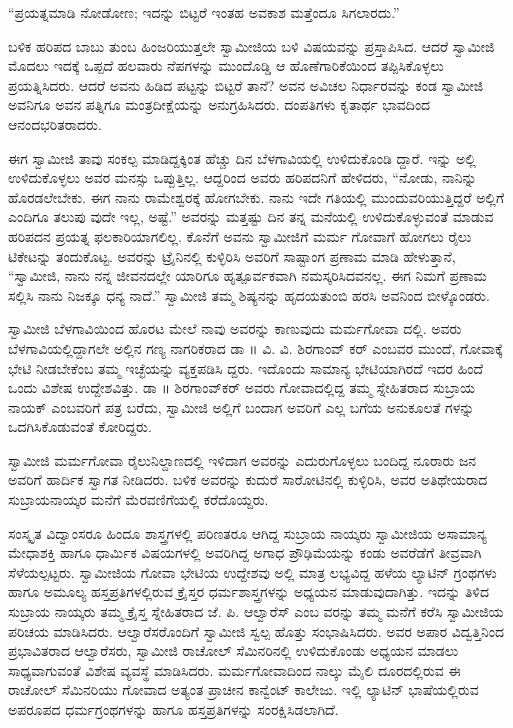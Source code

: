 “ಪ್ರಯತ್ನಮಾಡಿ ನೋಡೋಣ; ಇದನ್ನು ಬಿಟ್ಟರೆ ಇಂತಹ ಅವಕಾಶ ಮತ್ತೆಂದೂ ಸಿಗಲಾರದು.”

ಬಳಿಕ ಹರಿಪದ ಬಾಬು ತುಂಬ ಹಿಂಜರಿಯುತ್ತಲೇ ಸ್ವಾಮೀಜಿಯ ಬಳಿ ವಿಷಯವನ್ನು ಪ್ರಸ್ತಾಪಿಸಿದ. ಆದರೆ ಸ್ವಾಮೀಜಿ ಮೊದಲು ಇದಕ್ಕೆ ಒಪ್ಪದೆ ಹಲವಾರು ನೆಪಗಳನ್ನು ಮುಂದೊಡ್ಡಿ ಆ ಹೊಣೆಗಾರಿಕೆಯಿಂದ ತಪ್ಪಿಸಿಕೊಳ್ಳಲು ಪ್ರಯತ್ನಿಸಿದರು. ಆದರೆ ಅವನು ಹಿಡಿದ ಪಟ್ಟನ್ನು ಬಿಟ್ಟರೆ ತಾನೆ? ಅವನ ಅವಿಚಲ ನಿರ್ಧಾರವನ್ನು ಕಂಡ ಸ್ವಾಮೀಜಿ ಅವನಿಗೂ ಅವನ ಪತ್ನಿಗೂ ಮಂತ್ರದೀಕ್ಷೆಯನ್ನು ಅನುಗ್ರಹಿಸಿದರು. ದಂಪತಿಗಳು ಕೃತಾರ್ಥ ಭಾವದಿಂದ ಆನಂದಭರಿತರಾದರು.

ಈಗ ಸ್ವಾಮೀಜಿ ತಾವು ಸಂಕಲ್ಪ ಮಾಡಿದ್ದಕ್ಕಿಂತ ಹೆಚ್ಚು ದಿನ ಬೆಳಗಾವಿಯಲ್ಲಿ ಉಳಿದುಕೊಂಡಿ ದ್ದಾರೆ. ಇನ್ನು ಅಲ್ಲಿ ಉಳಿದುಕೊಳ್ಳಲು ಅವರ ಮನಸ್ಸು ಒಪ್ಪುತ್ತಿಲ್ಲ. ಆದ್ದರಿಂದ ಅವರು ಹರಿಪದನಿಗೆ ಹೇಳಿದರು, “ನೋಡು, ನಾನಿನ್ನು ಹೊರಡಲೇಬೇಕು. ಈಗ ನಾನು ರಾಮೇಶ್ವರಕ್ಕೆ ಹೋಗಬೇಕು. ನಾನು ಇದೇ ಗತಿಯಲ್ಲಿ ಮುಂದುವರಿಯುತ್ತಿದ್ದರೆ ಅಲ್ಲಿಗೆ ಎಂದಿಗೂ ತಲುಪು ವುದೇ ಇಲ್ಲ, ಅಷ್ಟೆ.” ಅವರನ್ನು ಮತ್ತಷ್ಟು ದಿನ ತನ್ನ ಮನೆಯಲ್ಲಿ ಉಳಿದುಕೊಳ್ಳುವಂತೆ ಮಾಡುವ ಹರಿಪದನ ಪ್ರಯತ್ನ ಫಲಕಾರಿಯಾಗಲಿಲ್ಲ. ಕೊನೆಗೆ ಅವನು ಸ್ವಾಮೀಜಿಗೆ ಮರ್ಮ ಗೋವಾಗೆ ಹೋಗಲು ರೈಲು ಟಿಕೇಟನ್ನು ತಂದುಕೊಟ್ಟ. ಅವರನ್ನು ಟ್ರೈನಿನಲ್ಲಿ ಕುಳ್ಳಿರಿಸಿ ಅವರಿಗೆ ಸಾಷ್ಟಾಂಗ ಪ್ರಣಾಮ ಮಾಡಿ ಹೇಳುತ್ತಾನೆ, “ಸ್ವಾಮೀಜಿ, ನಾನು ನನ್ನ ಜೀವನದಲ್ಲೇ ಯಾರಿಗೂ ಹೃತ್ಪೂರ್ವಕವಾಗಿ ನಮಸ್ಕರಿಸಿದವನಲ್ಲ. ಈಗ ನಿಮಗೆ ಪ್ರಣಾಮ ಸಲ್ಲಿಸಿ ನಾನು ನಿಜಕ್ಕೂ ಧನ್ಯ ನಾದೆ.” ಸ್ವಾಮೀಜಿ ತಮ್ಮ ಶಿಷ್ಯನನ್ನು ಹೃದಯತುಂಬಿ ಹರಸಿ ಅವನಿಂದ ಬೀಳ್ಕೊಂಡರು.

ಸ್ವಾಮೀಜಿ ಬೆಳಗಾವಿಯಿಂದ ಹೊರಟ ಮೇಲೆ ನಾವು ಅವರನ್ನು ಕಾಣುವುದು ಮರ್ಮಗೋವಾ ದಲ್ಲಿ. ಅವರು ಬೆಳಗಾವಿಯಲ್ಲಿದ್ದಾಗಲೇ ಅಲ್ಲಿನ ಗಣ್ಯ ನಾಗರಿಕರಾದ ಡಾ ॥ ವಿ. ವಿ. ಶಿರಗಾಂವ್ ಕರ್ ಎಂಬವರ ಮುಂದೆ, ಗೋವಾಕ್ಕೆ ಭೇಟಿ ನೀಡಬೇಕೆಂಬ ತಮ್ಮ ಇಚ್ಛೆಯನ್ನು ವ್ಯಕ್ತಪಡಿಸಿ ದ್ದರು. ಇದೊಂದು ಸಾಮಾನ್ಯ ಭೇಟಿಯಾಗಿರದೆ ಇದರ ಹಿಂದೆ ಒಂದು ವಿಶೇಷ ಉದ್ದೇಶವಿತ್ತು. ಡಾ ॥ ಶಿರಗಾಂವ್​ಕರ್ ಅವರು ಗೋವಾದಲ್ಲಿದ್ದ ತಮ್ಮ ಸ್ನೇಹಿತರಾದ ಸುಬ್ರಾಯ ನಾಯಕ್ ಎಂಬವರಿಗೆ ಪತ್ರ ಬರೆದು, ಸ್ವಾಮೀಜಿ ಅಲ್ಲಿಗೆ ಬಂದಾಗ ಅವರಿಗೆ ಎಲ್ಲ ಬಗೆಯ ಅನುಕೂಲತೆ ಗಳನ್ನು ಒದಗಿಸಿಕೊಡುವಂತೆ ಕೋರಿದ್ದರು.

ಸ್ವಾಮೀಜಿ ಮರ್ಮಗೋವಾ ರೈಲುನಿಲ್ದಾಣದಲ್ಲಿ ಇಳಿದಾಗ ಅವರನ್ನು ಎದುರುಗೊಳ್ಳಲು ಬಂದಿದ್ದ ನೂರಾರು ಜನ ಅವರಿಗೆ ಹಾರ್ದಿಕ ಸ್ವಾಗತ ನೀಡಿದರು. ಬಳಿಕ ಅವರನ್ನು ಕುದುರೆ ಸಾರೋಟಿನಲ್ಲಿ ಕುಳ್ಳಿರಿಸಿ, ಅವರ ಅತಿಥೇಯರಾದ ಸುಬ್ರಾಯನಾಯ್ಕರ ಮನೆಗೆ ಮೆರವಣಿಗೆಯಲ್ಲಿ ಕರೆದೊಯ್ದರು.

ಸಂಸ್ಕೃತ ವಿದ್ವಾಂಸರೂ ಹಿಂದೂ ಶಾಸ್ತ್ರಗಳಲ್ಲಿ ಪರಿಣತರೂ ಆಗಿದ್ದ ಸುಬ್ರಾಯ ನಾಯ್ಕರು ಸ್ವಾಮೀಜಿಯ ಅಸಾಮಾನ್ಯ ಮೇಧಾಶಕ್ತಿ ಹಾಗೂ ಧಾರ್ಮಿಕ ವಿಷಯಗಳಲ್ಲಿ ಅವರಿಗಿದ್ದ ಅಗಾಧ ಪ್ರೌಢಿಮೆಯನ್ನು ಕಂಡು ಅವರೆಡೆಗೆ ತೀವ್ರವಾಗಿ ಸೆಳೆಯಲ್ಪಟ್ಟರು. ಸ್ವಾಮೀಜಿಯ ಗೋವಾ ಭೇಟಿಯ ಉದ್ದೇಶವು ಅಲ್ಲಿ ಮಾತ್ರ ಲಭ್ಯವಿದ್ದ ಹಳೆಯ ಲ್ಯಾಟಿನ್ ಗ್ರಂಥಗಳು ಹಾಗೂ ಅಮೂಲ್ಯ ಹಸ್ತಪ್ರತಿಗಳಲ್ಲಿರುವ ಕ್ರೈಸ್ತರ ಧರ್ಮಶಾಸ್ತ್ರಗಳನ್ನು ಅಧ್ಯಯನ ಮಾಡುವುದಾಗಿತ್ತು. ಇದನ್ನು ತಿಳಿದ ಸುಬ್ರಾಯ ನಾಯ್ಕರು ತಮ್ಮ ಕ್ರೈಸ್ತ ಸ್ನೇಹಿತರಾದ ಜೆ. ಪಿ. ಆಲ್ವಾರೆಸ್ ಎಂಬ ವರನ್ನು ತಮ್ಮ ಮನೆಗೆ ಕರೆಸಿ ಸ್ವಾಮೀಜಿಯ ಪರಿಚಯ ಮಾಡಿಸಿದರು. ಆಲ್ವಾರೆಸರೊಂದಿಗೆ ಸ್ವಾಮೀಜಿ ಸ್ವಲ್ಪ ಹೊತ್ತು ಸಂಭಾಷಿಸಿದರು. ಅವರ ಅಪಾರ ವಿದ್ವತ್ತಿನಿಂದ ಪ್ರಭಾವಿತರಾದ ಆಲ್ವಾರೆಸರು, ಸ್ವಾಮೀಜಿ ರಾಚೋಲ್ ಸೆಮಿನರಿನಲ್ಲಿ ಉಳಿದುಕೊಂಡು ಅಧ್ಯಯನ ಮಾಡಲು ಸಾಧ್ಯವಾಗುವಂತೆ ವಿಶೇಷ ವ್ಯವಸ್ಥೆ ಮಾಡಿಸಿದರು. ಮರ್ಮಗೋವಾದಿಂದ ನಾಲ್ಕು ಮೈಲಿ ದೂರದಲ್ಲಿರುವ ಈ ರಾಚೋಲ್ ಸೆಮಿನರಿಯು ಗೋವಾದ ಅತ್ಯಂತ ಪ್ರಾಚೀನ ಕಾನ್ವೆಂಟ್ ಕಾಲೇಜು. ಇಲ್ಲಿ ಲ್ಯಾಟಿನ್ ಭಾಷೆಯಲ್ಲಿರುವ ಅಪರೂಪದ ಧರ್ಮಗ್ರಂಥಗಳನ್ನು ಹಾಗೂ ಹಸ್ತಪ್ರತಿಗಳನ್ನು ಸಂರಕ್ಷಿಸಿಡಲಾಗಿದೆ.

